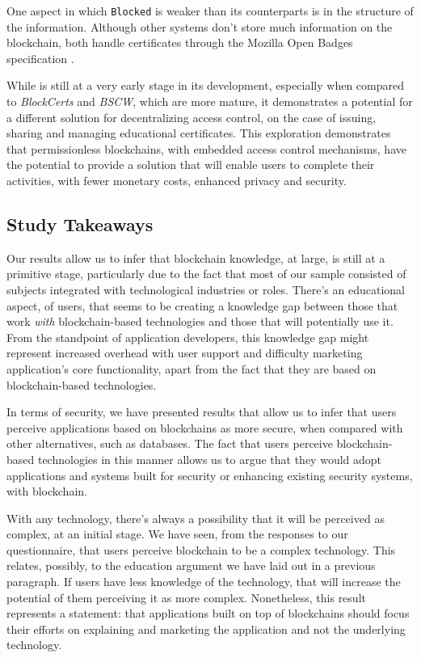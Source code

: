 One aspect in which \texttt{Blocked} is weaker than its counterparts is in the structure of the information. Although other systems don't store much information on the blockchain, both handle certificates through the Mozilla Open Badges specification \cite{openbadges}.

While  is still at a very early stage in its development, especially when compared to \emph{BlockCerts} and \emph{BSCW}, which are more mature, it demonstrates a potential for a different solution for decentralizing access control, on the case of issuing, sharing and managing educational certificates. This exploration demonstrates that permissionless blockchains, with embedded access control mechanisms, have the potential to provide a solution that will enable users to complete their activities, with fewer monetary costs, enhanced privacy and security.

\subsection{Study Takeaways}
\label{sec:eval-study}

Our results allow us to infer that blockchain knowledge, at large, is still at a primitive stage, particularly due to the fact that most of our sample consisted of subjects integrated with technological industries or roles. There's an educational aspect, of users, that seems to be creating a knowledge gap between those that work \emph{with} blockchain-based technologies and those that will potentially use it. From the standpoint of application developers, this knowledge gap might represent increased overhead with user support and difficulty marketing application's core functionality, apart from the fact that they are based on blockchain-based technologies.

In terms of security, we have presented results that allow us to infer that users perceive applications based on blockchains as more secure, when compared with other alternatives, such as databases. The fact that users perceive blockchain-based technologies in this manner allows us to argue that they would adopt applications and systems built for security or enhancing existing security systems, with blockchain. 

With any technology, there's always a possibility that it will be perceived as complex, at an initial stage. We have seen, from the responses to our questionnaire, that users perceive blockchain to be a complex technology. This relates, possibly, to the education argument we have laid out in a previous paragraph. If users have less knowledge of the technology, that will increase the potential of them perceiving it as more complex. Nonetheless, this result represents a statement: that applications built on top of blockchains should focus their efforts on explaining and marketing the application and not the underlying technology.

